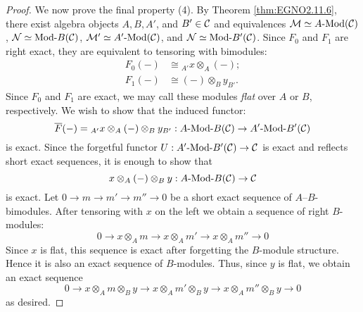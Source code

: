 \documentclass{amsart}
\begin{document}
\begin{proof}
We now prove the final property (4). By Theorem \ref{thm:EGNO2.11.6}, there exist algebra objects $A, B, A'$, and $B' \in \mathcal C$ and equivalences $\cM \simeq \Mod{A}{}(\cC)$, $\cN \simeq \Mod{}{B}(\cC)$, $\cM' \simeq \Mod{A'}{}(\cC)$, and $\cN \simeq \Mod{}{B'}(\cC)$. Since $F_0$ and $F_1$ are right exact, they are equivalent to tensoring with bimodules:
\begin{align*}
	F_0(-) &\cong {}_{A'}x \otimes_A (-); \\
	F_1(-) & \cong (-) \otimes_B y_{B'}.
\end{align*}
Since $F_0$ and $F_1$ are exact, we may call these modules {\em flat} over $A$ or $B$, respectively. We wish to show that the induced functor:
\begin{equation*}
	\overline{F}(-) = {}_{A'}x \otimes_A (-) \otimes_B y_{B'}: \Mod{A}{B}(\cC) \to \Mod{A'}{B'}(\cC)
\end{equation*}
is exact. Since the forgetful functor $U: \Mod{A'}{B'}(\cC) \to \cC$ is exact and reflects short exact sequences, it is enough to show that 
\begin{equation*}
	x \otimes_A (-) \otimes_B y: \Mod{A}{B}(\cC) \to \cC
\end{equation*}
is exact. Let $0 \to m \to m' \to m'' \to 0$ be a short exact sequence of $A$--$B$-bimodules. After tensoring with $x$ on the left we obtain a sequence of right $B$-modules:
\begin{equation*}
	0 \to x \otimes_A m \to x \otimes_A m' \to x \otimes_A {m''} \to 0
\end{equation*}
Since $x$ is flat, this sequence is exact after forgetting the $B$-module structure. Hence it is also an exact sequence of $B$-modules. Thus, since $y$ is flat, we obtain an exact sequence
\begin{equation*}
		0 \to x \otimes_A m \otimes_B y \to x \otimes_A m'\otimes_B y \to x \otimes_A {m''}  \otimes_B y \to 0
\end{equation*}
	as desired. 
\end{proof}
\end{document}
